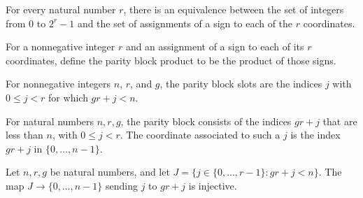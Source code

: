 \begin{definition}
\label{FABL.parityBlockAssignmentEquiv}
\leanok
{}
For every natural number $r$, there is an equivalence between the set of integers from
$0$ to $2^r-1$ and the set of assignments of a sign to each of the $r$ coordinates.
\end{definition}

\begin{definition}
\label{FABL.parityBlockProduct}
\leanok
{}
For a nonnegative integer $r$ and an assignment of a sign to each of its $r$
coordinates, define the parity block product to be the product of those signs.
\end{definition}

\begin{definition}
\label{FABL.parityBlockSlots}
\leanok
For nonnegative integers $n$, $r$, and $g$, the parity block slots are the indices $j$
with $0\leq j<r$ for which $gr+j<n$.
\end{definition}

\begin{definition}
\label{FABL.parityBlockCoordinate}
\leanok
{}
For natural numbers $n,r,g$, the parity block consists of the indices $g r+j$ that are
less than $n$, with $0\le j<r$. The coordinate associated to such a $j$ is the index $g
r+j$ in $\{0,\ldots,n-1\}$.
\end{definition}

\begin{theorem}
\label{FABL.parityBlockCoordinate_injective}
\leanok
{}
Let $n,r,g$ be natural numbers, and let $J=\{j\in\{0,\ldots,r-1\}:gr+j<n\}$. The map
$J\to\{0,\ldots,n-1\}$ sending $j$ to $gr+j$ is injective.
\end{theorem}

